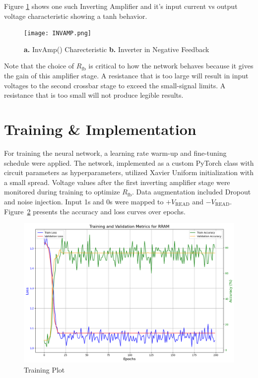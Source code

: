 \documentclass[conference]{IEEEtran}  %
\begin{document}
Figure \ref{fig:3} shows one such Inverting Amplifier and it's input current vs output voltage characteristic showing a tanh behavior.

\begin{figure}[h]
    \centering
    \texttt{[image: INVAMP.png]}
    \caption{\textbf{a.} InvAmp() Charecteristic \textbf{b.} Inverter in Negative Feedback}
    \label{fig:3}
\end{figure}

Note that the choice of $R_{\text{fb}}$ is critical to how the network behaves because it gives the gain of this amplifier stage. A resistance that is too large will result in input voltages to the second crossbar stage to exceed the small-signal limits. A resistance that is too small will not produce legible results.

\section{Training \& Implementation}
For training the neural network, a learning rate warm-up and fine-tuning schedule were applied. The network, implemented as a custom PyTorch class with circuit parameters as hyperparameters, utilized Xavier Uniform initialization with a small spread. Voltage values after the first inverting amplifier stage were monitored during training to optimize \( R_{\text{fb}} \). Data augmentation included Dropout and noise injection. Input 1s and 0s were mapped to $+V_{\text{READ}}$ and $-V_{\text{READ}}$. Figure~\ref{fig:4} presents the accuracy and loss curves over epochs.


\begin{figure}[h]
    \centering
    \includegraphics[width=1\linewidth]{Training_Plot.png}
    \caption{Training Plot}
    \label{fig:4}
\end{figure}
\end{document}
